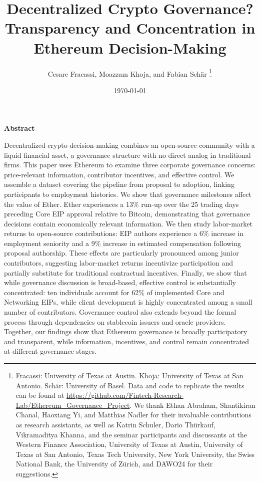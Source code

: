 \documentclass[No]{AEA}
\title{Decentralized Crypto Governance? \\ Transparency and Concentration in Ethereum Decision-Making}
\author{Cesare Fracassi, Moazzam Khoja, and Fabian Sch\"{a}r \thanks{Fracassi: University of Texas at Austin. Khoja: University of Texas at San Antonio. Sch\"{a}r: University of Basel. Data and code to replicate the results can be found at \url{https://github.com/Fintech-Research-Lab/Ethereum_Governance_Project}. We thank Ethan Abraham, Shantikiran Chanal, Haoxiang Yi, and Matthias Nadler for their invaluable contributions as research assistants, as well as Katrin Schuler, Dario Thürkauf, Vikramaditya Khanna, and the seminar participants and discussants at the Western Finance Association, University of Texas at Austin, University of Texas at San Antonio, Texas Tech University, New York University, the Swiss National Bank, the University of Zürich, and DAWO24 for their suggestions.}}
\date{\today}
\begin{document}
 \maketitle 

\begin{center}
    \textbf{Abstract}\\
\end{center}

\begin{singlespace}
Decentralized crypto decision-making combines an open-source community with a liquid financial asset, a governance structure with no direct analog in traditional firms. This paper uses Ethereum to examine three corporate governance concerns: price-relevant information, contributor incentives, and effective control. We assemble a dataset covering the pipeline from proposal to adoption, linking participants to employment histories. We show that governance milestones affect the value of Ether. Ether experiences a 13\% run-up over the 25 trading days preceding Core EIP approval relative to Bitcoin, demonstrating that governance decisions contain economically relevant information. We then study labor-market returns to open-source contributions: EIP authors experience a 6\% increase in employment seniority and a 9\% increase in estimated compensation following proposal authorship. These effects are particularly pronounced among junior contributors, suggesting labor-market returns incentivize participation and partially substitute for traditional contractual incentives. Finally, we show that while governance discussion is broad-based, effective control is substantially concentrated: ten individuals account for 62\% of implemented Core and Networking EIPs, while client development is highly concentrated among a small number of contributors. Governance control also extends beyond the formal process through dependencies on stablecoin issuers and oracle providers. Together, our findings show that Ethereum governance is broadly participatory and transparent, while information, incentives, and control remain concentrated at different governance stages.
\end{singlespace}




\end{document}
